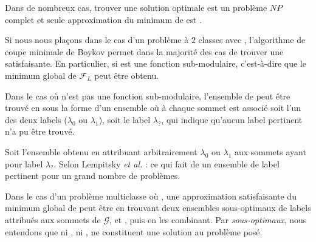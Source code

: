 Dans de nombreux cas, trouver une solution optimale est un problème $NP$ complet et seule  approximation du minimum de  est . 

Si nous nous plaçons dans le cas d'un problème à $2$ classes avec , l'algorithme de coupe minimale de Boykov  permet dans la majorité des cas de trouver une  satisfaisante. En particulier, si  est une fonction sub-modulaire, c'est-à-dire que  le minimum global de $\mathcal{F}_{L}$ peut être obtenu. 

Dans le cas où  n'est pas une fonction sub-modulaire, l'ensemble de  peut être trouvé en  sous la forme d'un ensemble  où à chaque sommet est associé soit l'un des deux labels  ($\lambda_{0}$ ou $\lambda_{1}$), soit le label $\lambda_{?}$, qui indique qu'aucun label pertinent n'a pu être trouvé. 

Soit l'ensemble   obtenu en attribuant arbitrairement $\lambda_{0}$ ou $\lambda_{1}$ aux sommets ayant pour label $\lambda_{?}$. Selon Lempitsky \textit{et al.} \cite{lempitsky2010fusion} :
ce qui fait de  un ensemble de label pertinent pour un grand nombre de problèmes.

Dans le cas d'un problème multiclasse où , une approximation satisfaisante du minimum global de  peut être  en trouvant deux ensembles sous-optimaux de labels attribués aux sommets de $\mathcal{G}$,  et , puis en les combinant. Par \textit{ sous-optimaux}, nous entendons que ni , ni , ne constituent une solution  au problème posé. 

